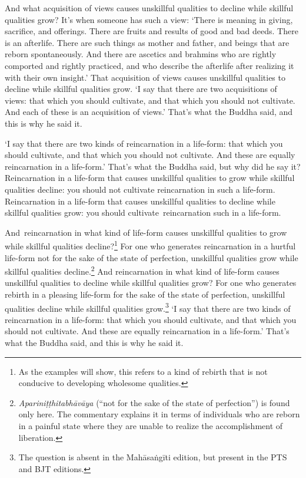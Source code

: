 \documentclass[12pt,openany]{book}%
\begin{document}
And what acquisition of views causes unskillful qualities to decline while skillful qualities grow? It’s when someone has such a view: ‘There is meaning in giving, sacrifice, and offerings. There are fruits and results of good and bad deeds. There is an afterlife. There are such things as mother and father, and beings that are reborn spontaneously. And there are ascetics and brahmins who are rightly comported and rightly practiced, and who describe the afterlife after realizing it with their own insight.’ That acquisition of views causes unskillful qualities to decline while skillful qualities grow. ‘I say that there are two acquisitions of views: that which you should cultivate, and that which you should not cultivate. And each of these is an acquisition of views.’ That’s what the Buddha said, and this is why he said it. 

‘I say that there are two kinds of reincarnation in a life-form: that which you should cultivate, and that which you should not cultivate. And these are equally reincarnation in a life-form.’ That’s what the Buddha said, but why did he say it? Reincarnation in a life-form that causes unskillful qualities to grow while skillful qualities decline: you should not cultivate reincarnation in such a life-form. Reincarnation in a life-form that causes unskillful qualities to decline while skillful qualities grow: you should cultivate reincarnation such in a life-form. 

And reincarnation in what kind of life-form causes unskillful qualities to grow while skillful qualities decline?\footnote{As the examples will show, this refers to a kind of rebirth that is not conducive to developing wholesome qualities. } For one who generates reincarnation in a hurtful life-form not for the sake of the state of perfection, unskillful qualities grow while skillful qualities decline.\footnote{\textit{\textsanskrit{Apariniṭṭhitabhāvāya}} (“not for the sake of the state of perfection”) is found only here. The commentary explains it in terms of individuals who are reborn in a painful state where they are unable to realize the accomplishment of liberation. } And reincarnation in what kind of life-form causes unskillful qualities to decline while skillful qualities grow? For one who generates rebirth in a pleasing life-form for the sake of the state of perfection, unskillful qualities decline while skillful qualities grow.\footnote{The question is absent in the \textsanskrit{Mahāsaṅgīti} edition, but present in the PTS and BJT editions. } ‘I say that there are two kinds of reincarnation in a life-form: that which you should cultivate, and that which you should not cultivate. And these are equally reincarnation in a life-form.’ That’s what the Buddha said, and this is why he said it. 
\end{document}
